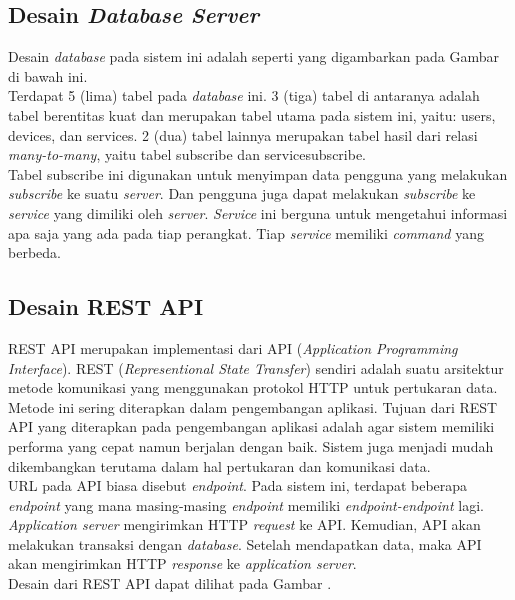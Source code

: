\subsection{Desain \textit{Database Server}}
\tab Desain \textit{database} pada sistem ini adalah seperti yang digambarkan pada Gambar di bawah ini. \\
\tab Terdapat 5 (lima) tabel pada \textit{database} ini. 3 (tiga) tabel di antaranya adalah tabel berentitas kuat dan merupakan tabel utama pada sistem ini, yaitu: users, devices, dan services. 2 (dua) tabel lainnya merupakan tabel hasil dari relasi \textit{many-to-many}, yaitu tabel subscribe dan servicesubscribe. \\
\tab Tabel subscribe ini digunakan untuk menyimpan data pengguna yang melakukan \textit{subscribe} ke suatu \textit{server}. Dan pengguna juga dapat melakukan \textit{subscribe} ke \textit{service} yang dimiliki oleh \textit{server}. \textit{Service} ini berguna untuk mengetahui informasi apa saja yang ada pada tiap perangkat. Tiap \textit{service} memiliki \textit{command} yang berbeda.

\subsection{Desain REST API}
\tab REST API merupakan implementasi dari API (\textit{Application Programming Interface}). REST (\textit{Representional State Transfer}) sendiri adalah suatu arsitektur metode komunikasi yang menggunakan protokol HTTP untuk pertukaran data. Metode ini sering diterapkan dalam pengembangan aplikasi. Tujuan dari REST API yang diterapkan pada pengembangan aplikasi adalah agar sistem memiliki performa yang cepat namun berjalan dengan baik. Sistem juga menjadi mudah dikembangkan terutama dalam hal pertukaran dan komunikasi data. \\
\tab URL pada API biasa disebut \textit{endpoint}. Pada sistem ini, terdapat beberapa \textit{endpoint} yang mana masing-masing \textit{endpoint} memiliki \textit{endpoint-endpoint} lagi. \\
\tab \textit{Application server} mengirimkan HTTP \textit{request} ke API. Kemudian, API akan melakukan transaksi dengan \textit{database}. Setelah mendapatkan data, maka API akan mengirimkan HTTP \textit{response} ke \textit{application server}. \\
\tab Desain dari REST API dapat dilihat pada Gambar . \\